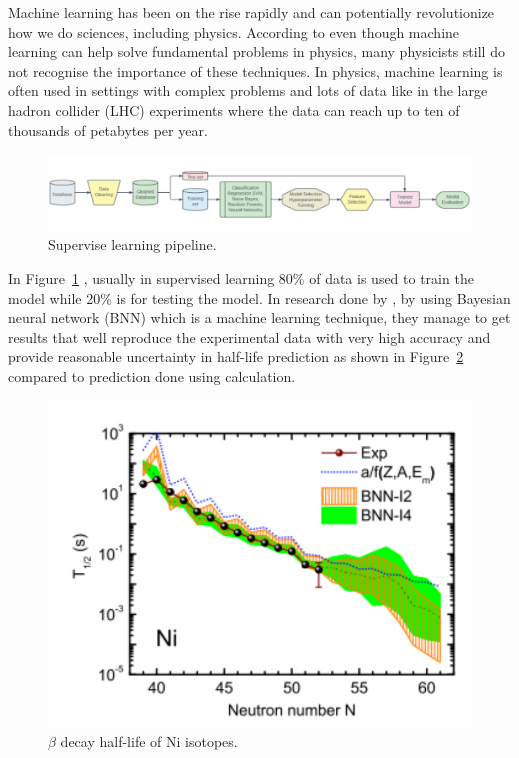 Machine learning has been on the rise rapidly and can potentially revolutionize how we do sciences, including physics. According to  even though machine learning can help solve fundamental problems in physics, many physicists still do not recognise the importance of these techniques. In physics, machine learning is often used in settings with complex problems and lots of data like in the large hadron collider (LHC) experiments where the data can reach up to ten of thousands of petabytes per year. 

\begin{figure}[H]
	\centering
	\includegraphics[width=\textwidth]{assets/SLpipe.png}
	\caption{Supervise learning pipeline.}
	\label{fig:SLP}
\end{figure}

In Figure~\ref{fig:SLP} , usually in supervised learning 80\% of data is used to train the model while 20\% is for testing the model.
In research done by , by using Bayesian neural network (BNN) which is a machine learning technique, they manage to get results that well reproduce the experimental data with very high accuracy and provide reasonable uncertainty in half-life prediction as shown in Figure~\ref{fig:NNcon} compared to prediction done using calculation.  
\begin{figure}[H]
	\centering
	\includegraphics[width=\textwidth,height=0.4\textheight]{assets/NNcon.png}
	\caption{$\beta$ decay half-life of Ni isotopes.}
	\label{fig:NNcon}
\end{figure}

